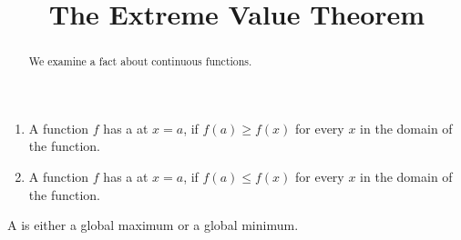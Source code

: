 \documentclass{ximera}
\title[Dig-In:]{The Extreme Value Theorem}
\begin{document}
\begin{abstract}
  We examine a fact about continuous functions.
\end{abstract}
\maketitle

\begin{definition}\hfil{}
\begin{enumerate}
\item A function $f$ has a  at $x=a$, if $f(a)\ge
  f(x)$ for every $x$ in the domain of the function.
\item A function $f$ has a  at $x=a$, if $f(a)\le
  f(x)$ for every $x$ in the domain of the function.
\end{enumerate} 
A  is either a
global maximum or a global minimum.
\end{definition}
\end{document}
